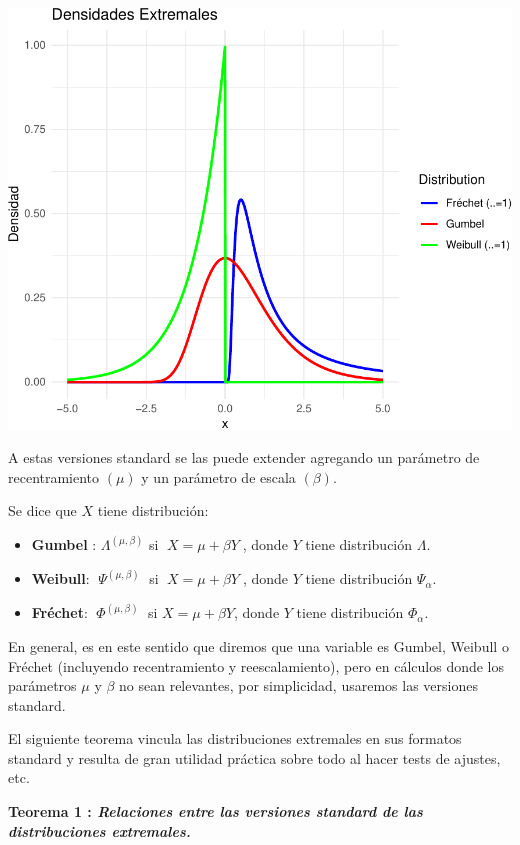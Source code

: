 \documentclass[
]{book}
\theoremstyle{definition}
\theoremstyle{definition}
\theoremstyle{definition}
\theoremstyle{definition}
\theoremstyle{remark}
\begin{document}
\includegraphics{_main_files/figure-latex/plot-extreme-distributions-1.pdf}

A estas versiones standard se las puede extender
agregando un parámetro de recentramiento \((\mu)\) y
un parámetro de escala \((\beta)\).

Se dice que \(X\) tiene distribución:

\begin{itemize}
\item
  \textbf{Gumbel} : \(\Lambda^{(\mu, \beta)}\) si \(\;X=\mu + \beta Y\;\), donde \(Y\) tiene distribución \(\Lambda\).
\item
  \textbf{Weibull}: \(\;\Psi^{(\mu, \beta)}\;\) si \(\;X=\mu + \beta Y\;\), donde \(Y\) tiene distribución \(\Psi_{\alpha}\).
\item
  \textbf{Fréchet}: \(\;\Phi^{(\mu, \beta)}\;\) si \(X=\mu + \beta Y\), donde \(Y\) tiene distribución \(\Phi_{\alpha}\).
\end{itemize}

En general, es en este sentido que diremos que una
variable es Gumbel, Weibull o Fréchet (incluyendo
recentramiento y reescalamiento), pero en cálculos
donde los parámetros \(\mu\) y \(\beta\) no sean relevantes, por
simplicidad, usaremos las versiones standard.

El siguiente teorema vincula las distribuciones
extremales en sus formatos standard y resulta de
gran utilidad práctica sobre todo al hacer tests de
ajustes, etc.

\textbf{Teorema 1 : \emph{Relaciones entre las versiones
standard de las distribuciones extremales.}}
\end{document}
